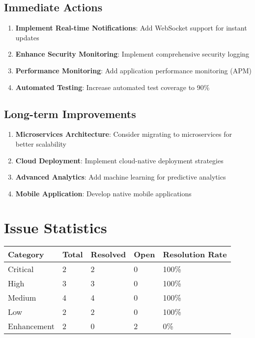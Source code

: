 \documentclass[12pt,a4paper]{article}
\begin{document}
\subsection{Immediate Actions}

\begin{enumerate}
    \item \textbf{Implement Real-time Notifications}: Add WebSocket support for instant updates
    \item \textbf{Enhance Security Monitoring}: Implement comprehensive security logging
    \item \textbf{Performance Monitoring}: Add application performance monitoring (APM)
    \item \textbf{Automated Testing}: Increase automated test coverage to 90\%
\end{enumerate}

\subsection{Long-term Improvements}

\begin{enumerate}
    \item \textbf{Microservices Architecture}: Consider migrating to microservices for better scalability
    \item \textbf{Cloud Deployment}: Implement cloud-native deployment strategies
    \item \textbf{Advanced Analytics}: Add machine learning for predictive analytics
    \item \textbf{Mobile Application}: Develop native mobile applications
\end{enumerate}

\section{Issue Statistics}

\begin{longtable}{|p{3cm}|p{2cm}|p{2cm}|p{2cm}|p{3cm}|}
\hline
\textbf{Category} & \textbf{Total} & \textbf{Resolved} & \textbf{Open} & \textbf{Resolution Rate} \\
\hline
Critical & 2 & 2 & 0 & 100\% \\
\hline
High & 3 & 3 & 0 & 100\% \\
\hline
Medium & 4 & 4 & 0 & 100\% \\
\hline
Low & 2 & 2 & 0 & 100\% \\
\hline
Enhancement & 2 & 0 & 2 & 0\% \\
\hline
\end{longtable}
\end{document}
